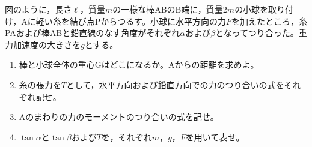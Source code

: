 \item
    \begin{mawarikomi}{180pt}{}
    図のように，長さ$\ell $，質量$m$の一様な棒ABのB端に，質量$2m$の小球を取り付け，Aに軽い糸を結び点Pからつるす。小球に水平方向の力$F$を加えたところ，糸PAおよび棒ABと鉛直線のなす角度がそれぞれ$\alpha $および$\beta $となってつり合った。重力加速度の大きさを$g$とする。
        \begin{enumerate}
            \item 棒と小球全体の重心Gはどこになるか。Aからの距離を求めよ。
            \item 糸の張力を$T$として，水平方向および鉛直方向での力のつり合いの式をそれぞれ記せ。
            \item Aのまわりの力のモーメントのつり合いの式を記せ。
            \item $\tan{\alpha}$と$\tan{\beta }$および$T$を，それぞれ$m$，$g$，$F$を用いて表せ。
        \end{enumerate}
    \end{mawarikomi}